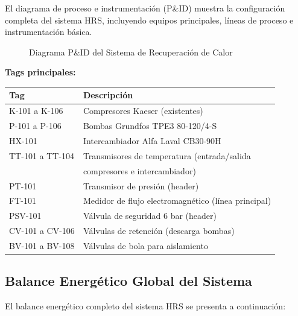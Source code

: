 \documentclass[12pt,a4paper]{article}
\begin{document}
El diagrama de proceso e instrumentación (P\&ID) muestra la configuración completa del sistema HRS, incluyendo equipos principales, líneas de proceso e instrumentación básica.

\begin{figure}[h]
\centering
{}
\caption{Diagrama P\&ID del Sistema de Recuperación de Calor}
\end{figure}

\textbf{Tags principales:}

\begin{table}[h]
\centering
\small
\begin{tabular}{ll}
\toprule
\textbf{Tag} & \textbf{Descripción} \\
\midrule
K-101 a K-106 & Compresores Kaeser (existentes) \\
P-101 a P-106 & Bombas Grundfos TPE3 80-120/4-S \\
HX-101 & Intercambiador Alfa Laval CB30-90H \\
TT-101 a TT-104 & Transmisores de temperatura (entrada/salida \\
 & compresores e intercambiador) \\
PT-101 & Transmisor de presión (header) \\
FT-101 & Medidor de flujo electromagnético (línea principal) \\
PSV-101 & Válvula de seguridad 6 bar (header) \\
CV-101 a CV-106 & Válvulas de retención (descarga bombas) \\
BV-101 a BV-108 & Válvulas de bola para aislamiento \\
\bottomrule
\end{tabular}
\end{table}

\subsection{Balance Energético Global del Sistema}

El balance energético completo del sistema HRS se presenta a continuación:
\end{document}
